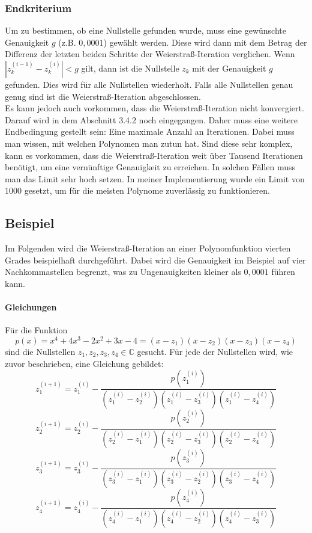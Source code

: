 \documentclass[12pt]{article}
\begin{document}
\subsubsection{Endkriterium}
Um zu bestimmen, ob eine Nullstelle gefunden wurde, muss eine gewünschte Genauigkeit $g$ (z.B. $0,0001$) gewählt werden. Diese wird dann mit dem Betrag der Differenz der letzten beiden Schritte der Weierstraß-Iteration verglichen. Wenn $|z_k^{(i-1)}-z_k^{(i)}| < g$ gilt, dann ist die Nullstelle $z_k$ mit der Genauigkeit $g$ gefunden. Dies wird für alle Nullstellen wiederholt. Falls alle Nullstellen genau genug sind ist die Weierstraß-Iteration abgeschlossen.\\
Es kann jedoch auch vorkommen, dass die Weierstraß-Iteration nicht konvergiert. Darauf wird in dem Abschnitt 3.4.2 noch eingegangen. Daher muss eine weitere Endbedingung gestellt sein: Eine maximale Anzahl an Iterationen. Dabei muss man wissen, mit welchen Polynomen man zutun hat. Sind diese sehr komplex, kann es vorkommen, dass die Weierstraß-Iteration weit über Tausend Iterationen benötigt, um eine vernünftige Genauigkeit zu erreichen. In solchen Fällen muss man das Limit sehr hoch setzen. In meiner Implementierung wurde ein Limit von 1000 gesetzt, um für die meisten Polynome zuverlässig zu funktionieren.

\subsection{Beispiel}
Im Folgenden wird die Weierstraß-Iteration an einer Polynomfunktion vierten Grades beispielhaft durchgeführt. Dabei wird die Genauigkeit im Beispiel auf vier Nachkommastellen begrenzt, was zu Ungenauigkeiten kleiner als $0,0001$ führen kann.
\paragraph{Gleichungen}
Für die Funktion
\begin{equation*}
    p(x) = x^4 + 4x^3 - 2x^2 + 3x - 4 = (x-z_1)(x-z_2)(x-z_3)(x-z_4)
\end{equation*}
sind die Nullstellen $z_1,z_2,z_3,z_4 \in \mathbb{C}$ gesucht. Für jede der Nullstellen wird, wie zuvor beschrieben, eine Gleichung gebildet:
\begin{equation*}
    z_1^{(i+1)} = z_1^{(i)}-\frac{p(z_1^{(i)})}{(z_1^{(i)}-z_2^{(i)})(z_1^{(i)}-z_3^{(i)})(z_1^{(i)}-z_4^{(i)})}
\end{equation*}
\begin{equation*}
    z_2^{(i+1)} = z_2^{(i)}-\frac{p(z_2^{(i)})}{(z_2^{(i)}-z_1^{(i)})(z_2^{(i)}-z_3^{(i)})(z_2^{(i)}-z_4^{(i)})}
\end{equation*}
\begin{equation*}
    z_3^{(i+1)} = z_3^{(i)}-\frac{p(z_3^{(i)})}{(z_3^{(i)}-z_1^{(i)})(z_3^{(i)}-z_2^{(i)})(z_3^{(i)}-z_4^{(i)})}
\end{equation*}
\begin{equation*}
    z_4^{(i+1)} = z_4^{(i)}-\frac{p(z_4^{(i)})}{(z_4^{(i)}-z_1^{(i)})(z_4^{(i)}-z_2^{(i)})(z_4^{(i)}-z_3^{(i)})}
\end{equation*}
\end{document}
